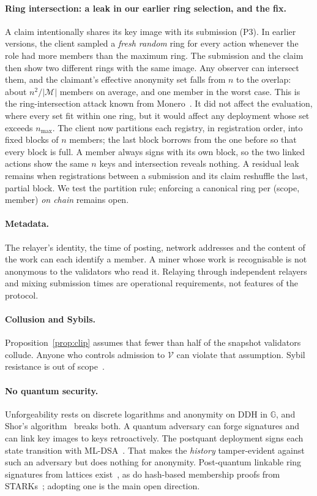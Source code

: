 \documentclass[11pt]{article}
\theoremstyle{remark}
\newcommand{\G}{\mathbb{G}}
\begin{document}
\paragraph{Ring intersection: a leak in our earlier ring selection, and the fix.}\label{sec:intersection}
A claim intentionally shares its key image with its submission (P3). In earlier versions, the client sampled a \emph{fresh random} ring for every action whenever the role had more members than the maximum ring. The submission and the claim then show two different rings with the same image. Any observer can intersect them, and the claimant's effective anonymity set falls from $n$ to the overlap: about $n^2/|\mathcal{M}|$ members on average, and one member in the worst case. This is the ring-intersection attack known from Monero~\cite{kumar17,moser18}. It did not affect the evaluation, where every set fit within one ring, but it would affect any deployment whose set exceeds $n_{\max}$. The client now partitions each registry, in registration order, into fixed blocks of $n$ members; the last block borrows from the one before so that every block is full. A member always signs with its own block, so the two linked actions show the same $n$ keys and intersection reveals nothing. A residual leak remains when registrations between a submission and its claim reshuffle the last, partial block. We test the partition rule; enforcing a canonical ring per (scope, member) \emph{on chain} remains open.

\paragraph{Metadata.} The relayer's identity, the time of posting, network addresses and the content of the work can each identify a member. A miner whose work is recognisable is not anonymous to the validators who read it. Relaying through independent relayers and mixing submission times are operational requirements, not features of the protocol.

\paragraph{Collusion and Sybils.} Proposition~\ref{prop:clip} assumes that fewer than half of the snapshot validators collude. Anyone who controls admission to $\mathcal{V}$ can violate that assumption. Sybil resistance is out of scope~\cite{sybil}.

\paragraph{No quantum security.} Unforgeability rests on discrete logarithms and anonymity on DDH in $\G$, and Shor's algorithm~\cite{shor94} breaks both. A quantum adversary can forge signatures and can link key images to keys retroactively. The postquant deployment signs each state transition with ML-DSA~\cite{fips204}. That makes the \emph{history} tamper-evident against such an adversary but does nothing for anonymity. Post-quantum linkable ring signatures from lattices exist~\cite{matrict}, as do hash-based membership proofs from STARKs~\cite{stark}; adopting one is the main open direction.
\end{document}
